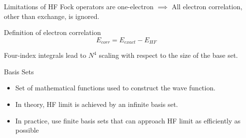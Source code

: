 \documentclass[aspectratio=169]{beamer}
\begin{document}
    \begin{frame}{Limitations of HF}
        Fock operators are one-electron $\implies$ All electron correlation, other than exchange, is ignored.

        \begin{alertblock}{Definition of electron correlation}
            \begin{equation*}
                E_{corr} = E_{exact} - E_{HF}
            \end{equation*}
        \end{alertblock}

        Four-index integrals lead to $N^4$ scaling with respect to the size of the base set.

    \end{frame}

    \begin{frame}{Basis Sets}

        \begin{itemize}
            \item Set of mathematical functions used to construct the wave function.
            \item In theory, HF limit is achieved by an infinite basis set.
            \item In practice, use finite basis sets that can approach HF limit as efficiently as possible
        \end{itemize}

    \end{frame}
\end{document}
